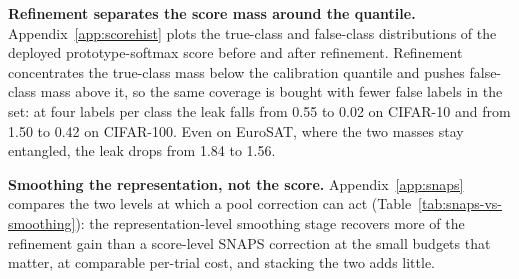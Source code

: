 \textbf{Refinement separates the score mass around the quantile.}
Appendix~\ref{app:scorehist} plots the true-class and false-class
distributions of the deployed prototype-softmax score before and after
refinement. Refinement concentrates the true-class mass below the
calibration quantile and pushes false-class mass above it, so the same
coverage is bought with fewer false labels in the set: at four labels
per class the leak falls from 0.55 to 0.02 on CIFAR-10 and from 1.50
to 0.42 on CIFAR-100. Even on EuroSAT, where the two masses stay
entangled, the leak drops from 1.84 to 1.56.

\textbf{Smoothing the representation, not the score.}
Appendix~\ref{app:snaps} compares the two levels at which a pool
correction can act (Table~\ref{tab:snaps-vs-smoothing}): the
representation-level smoothing stage recovers more of the refinement
gain than a score-level SNAPS correction at the small budgets that
matter, at comparable per-trial cost, and stacking the two adds little.


